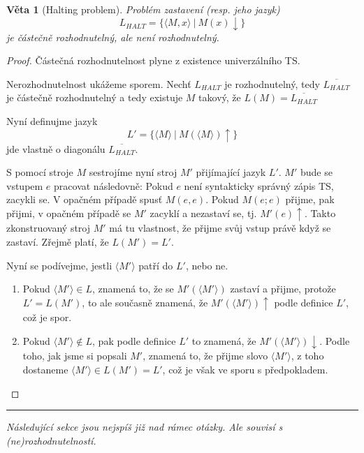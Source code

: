 \documentclass[11pt]{report} %
\newtheorem{theorem}{Věta}[section]
\numberwithin{equation}{section}
\begin{document}
\begin{theorem}[Halting problem]
Problém zastavení (resp. jeho jazyk)
$$L_{HALT} = \{\langle M, x\rangle\ |\ M(x){\downarrow} \}$$
je částečně rozhodnutelný, ale není rozhodnutelný.
\end{theorem}
\begin{proof}
Částečná rozhodnutelnost plyne z existence univerzálního TS. 

Nerozhodnutelnost ukážeme sporem. Nechť $L_{HALT}$ je rozhodnutelný, tedy $\overline{L_{HALT}}$ je částečně rozhodnutelný a tedy existuje $M$ takový, že $L(M) = \overline{L_{HALT}}$

Nyní definujme jazyk 
$$L' = \{\langle M\rangle\ |\ M(\langle M\rangle){\uparrow}\}$$ 
jde vlastně o diagonálu $\overline{L_{HALT}}$.
 
S pomocí stroje $M$ sestrojíme nyní stroj $M'$ přijímající jazyk $L'$. $M'$ bude se vstupem $e$ pracovat následovně: Pokud $e$ není syntakticky správný zápis TS, zacykli se. V opačném případě spusť $M(e, e)$. Pokud $M(e; e)$ přijme, pak přijmi, v opačném případě se $M'$ zacyklí a nezastaví se, tj. $M'(e){\uparrow}$. Takto zkonstruovaný stroj $M'$ má tu vlastnost, že přijme svůj vstup právě když se zastaví. Zřejmě platí, že $L(M') = L'$. 

Nyní se podívejme, jestli $\langle M' \rangle$ patří do $L'$, nebo ne.
\begin{enumerate}
	
	
	\item Pokud $\langle M' \rangle \in L$, znamená to, že se $M'(\langle M' \rangle)$ zastaví a přijme, protože $L' = L(M')$, to ale současně znamená, že $M'(\langle M' \rangle){\uparrow}$ podle definice $L'$, což je spor.
	
	\item Pokud $\langle M' \rangle \notin L$, pak podle definice $L'$ to znamená, že $M'(\langle M' \rangle){\downarrow}$. Podle toho, jak jsme si popsali $M'$, znamená to, že přijme slovo $\langle M' \rangle$, z toho dostaneme $\langle M' \rangle \in L(M') = L'$, což je však ve sporu s předpokladem.
\end{enumerate}
\end{proof}

\hrule
\medskip
\textit{Následující sekce jsou nejspíš již nad rámec otázky. Ale souvisí s (ne)rozhodnutelností.}
\end{document}
